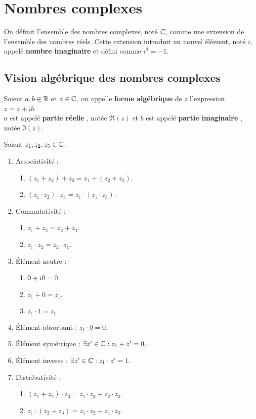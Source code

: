 \chapter{Nombres complexes}
\def\arraystretch{1}
On définit l'ensemble des nombres complexes, noté $\mathbb{C}$, comme une extension de l'ensemble des nombres réels.
Cette extension introduit un nouvel élément, noté $i$, appelé \textbf{nombre imaginaire} et défini comme $i^2=-1$.

\section{Vision algébrique des nombres complexes}
\begin{definition}
    Soient $a, b \in \mathbb{R}$ et $z \in \mathbb{C}$, on appelle \textbf{forme algébrique} de $z$ l'expression $z = a + ib$.
    \\
    $a$ est appelé \og \textbf{partie réelle} \fg, notée $\Re(z)$ et $b$ est appelé \og \textbf{partie imaginaire} \fg, notée $\Im(z)$.
\end{definition}

\begin{proposition}
	Soient $z_1, z_2, z_3 \in \mathbb{C}$.
	\begin{enumerate}
		\item Associativité : 
		\begin{enumerate}
			\item $(z_1 + z_2) + z_3 = z_1 + (z_2 + z_3)$.
			\item $(z_1 \cdot z_2) \cdot z_3 = z_1 \cdot (z_1 \cdot z_3)$.
		\end{enumerate}
		\item Commutativité :
		\begin{enumerate}
			\item $z_1 + z_2 = z_2 + z_1$.
			\item $z_1 \cdot z_2 = z_2 \cdot z_1$.
		\end{enumerate}
		\item \'Elément neutre :
		\begin{enumerate}
			\item $0 + i0 = 0$.
			\item $z_1 + 0 = z_1$.
			\item $z_1 \cdot 1 = z_1$
		\end{enumerate}
		\item \'Elément absorbant : $z_1 \cdot 0 = 0$.
		\item \'Elément symétrique : $\exists z' \in \mathbb{C} : z_1 + z' = 0$.
		\item \'Elément inverse : $\exists z' \in \mathbb{C} :  z_1 \cdot z' = 1$.
		\item Distributivité :
		\begin{enumerate}
			\item $(z_1 + z_2) \cdot z_3 = z_1 \cdot z_3 + z_2 \cdot z_3$.
			\item $z_1 \cdot (z_2 + z_3) = z_1 \cdot z_2 + z_1 \cdot z_3$.
		\end{enumerate}
	\end{enumerate}
\end{proposition}


